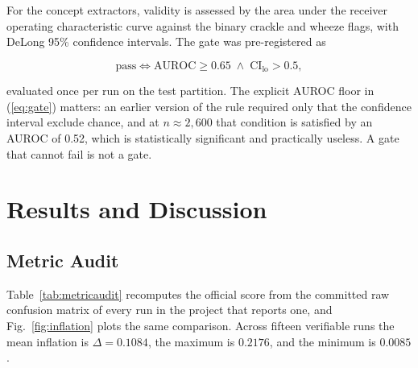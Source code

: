 \documentclass[journal,onecolumn]{IEEEtran}
\begin{document}
For the concept extractors, validity is assessed by the area under the receiver
operating characteristic curve against the binary crackle and wheeze flags, with
DeLong 95\% confidence intervals. The gate was pre-registered as

\begin{equation}
\label{eq:gate}
\text{pass} \iff \mathrm{AUROC} \geq 0.65 \;\wedge\; \mathrm{CI}_{\text{lo}} > 0.5 ,
\end{equation}

\noindent evaluated once per run on the test partition. The explicit AUROC floor in
(\ref{eq:gate}) matters: an earlier version of the rule required only that the
confidence interval exclude chance, and at $n \approx 2{,}600$ that condition is
satisfied by an AUROC of 0.52, which is statistically significant and practically
useless. A gate that cannot fail is not a gate.

\section{Results and Discussion}
\label{sec:results}

\subsection{Metric Audit}
\label{subsec:metric_audit}

Table~\ref{tab:metricaudit} recomputes the official score from the committed raw
confusion matrix of every run in the project that reports one, and
Fig.~\ref{fig:inflation} plots the same comparison. Across fifteen verifiable runs the
mean inflation is $\Delta = 0.1084$, the maximum is $0.2176$, and the minimum is
$0.0085$.
\end{document}
